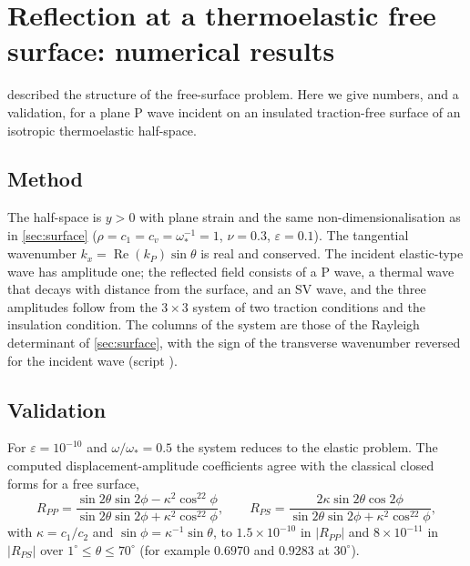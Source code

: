 \section{Reflection at a thermoelastic free surface: numerical results}\label{sec:reflection}

 described the structure of the free-surface problem. Here we give numbers, and a validation, for a plane P wave incident on an insulated traction-free surface of an isotropic thermoelastic half-space.

\subsection{Method}
The half-space is $y>0$ with plane strain and the same non-dimensionalisation as in \cref{sec:surface} ($\rho=c_1=c_v=\omega_*^{-1}=1$, $\nu=0.3$, $\varepsilon=0.1$). The tangential wavenumber $k_x=\operatorname{Re}(k_P)\sin\theta$ is real and conserved. The incident elastic-type wave has amplitude one; the reflected field consists of a P wave, a thermal wave that decays with distance from the surface, and an SV wave, and the three amplitudes follow from the $3\times3$ system of two traction conditions and the insulation condition. The columns of the system are those of the Rayleigh determinant of \cref{sec:surface}, with the sign of the transverse wavenumber reversed for the incident wave (script ).

\subsection{Validation}
For $\varepsilon=10^{-10}$ and $\omega/\omega_*=0.5$ the system reduces to the elastic problem. The computed displacement-amplitude coefficients agree with the classical closed forms for a free surface, 
\begin{equation}
R_{PP}=\frac{\sin2\theta\sin2\phi-\kappa^2\cos^22\phi}{\sin2\theta\sin2\phi+\kappa^2\cos^22\phi},\qquad
R_{PS}=\frac{2\kappa\sin2\theta\cos2\phi}{\sin2\theta\sin2\phi+\kappa^2\cos^22\phi},
\end{equation}
with $\kappa=c_1/c_2$ and $\sin\phi=\kappa^{-1}\sin\theta$, to $1.5\times10^{-10}$ in $|R_{PP}|$ and $8\times10^{-11}$ in $|R_{PS}|$ over $1^\circ\le\theta\le70^\circ$ (for example $0.6970$ and $0.9283$ at $30^\circ$).

